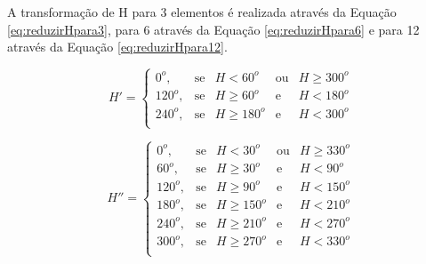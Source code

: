 \documentclass[	12pt, Times, openright, twoside, a4paper, english, brazil]{abntex2}
\begin{document}
A transformação de H para 3 elementos é realizada através da Equação \ref{eq:reduzirHpara3}, para 6 através da Equação \ref{eq:reduzirHpara6} e para 12 através da Equação \ref{eq:reduzirHpara12}. 

\begin{equation}
\label{eq:reduzirHpara3}
H'=\left\{
\begin{array}{rclcl}
    0^o,    &\mbox{se}  & H <60^o       & \mbox{ou} & H \geq 300^o  \\
    120^o,  &\mbox{se}  & H \geq 60^o   & \mbox{e}  & H < 180^o     \\
    240^o,  &\mbox{se}  & H \geq 180^o  & \mbox{e}  & H < 300^o     \\
\end{array}\right.
\end{equation}

\begin{equation}
\label{eq:reduzirHpara6}
H''=\left\{
\begin{array}{rclcl}
    0^o,    &\mbox{se}  & H <30^o       & \mbox{ou} & H \geq 330^o  \\
    60^o,   &\mbox{se}  & H \geq 30^o   & \mbox{e}  & H < 90^o      \\
    120^o,  &\mbox{se}  & H \geq 90^o   & \mbox{e}  & H < 150^o     \\
    180^o,  &\mbox{se}  & H \geq 150^o  & \mbox{e}  & H < 210^o     \\
    240^o,  &\mbox{se}  & H \geq 210^o  & \mbox{e}  & H < 270^o     \\
    300^o,  &\mbox{se}  & H \geq 270^o  & \mbox{e}  & H < 330^o     \\
\end{array}\right.
\end{equation}
\end{document}
